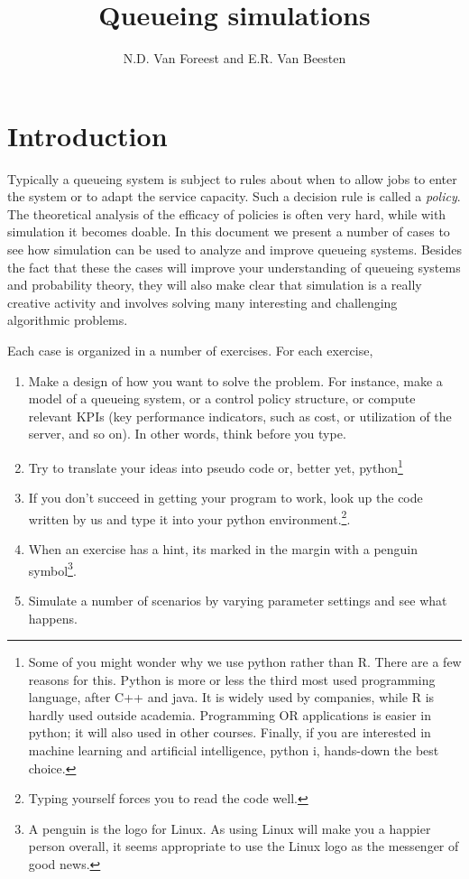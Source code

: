 \documentclass{scrartcl}
\title{Queueing simulations}
\author{N.D. Van Foreest and E.R. Van Beesten}
\begin{document}
\maketitle
\tableofcontents


\section{Introduction}

Typically a queueing system is subject to rules about when to allow jobs to enter the system or to adapt the service capacity.
Such a decision rule is called a \emph{policy}.
The theoretical analysis of the efficacy of policies is often very hard, while with simulation it becomes doable.
In this document we present a number of cases to see how simulation can be used to analyze and improve queueing systems.
Besides the fact that these the cases will improve your understanding of queueing systems and probability theory, they will also make clear that simulation is a really creative activity and involves solving many interesting and challenging algorithmic problems.


Each case is organized in a number of exercises.
For each exercise,
\begin{enumerate}
\item Make a design of how you want to solve the problem.
  For instance, make a model of a queueing system, or a control policy structure, or compute relevant KPIs (key performance indicators, such as cost, or utilization of the server, and so on).
  In other words, think before you type.
\item Try to translate your ideas into pseudo code or, better yet, python\footnote{Some of you might wonder why we use python rather than R.
    There are a few reasons for this.
    Python is more or less the third most used programming language, after C++ and java.
    It is widely used by companies, while R is hardly used outside academia.
    Programming OR applications is easier in python; it will also used in other courses.
    Finally, if you are interested in machine learning and artificial intelligence, python i, hands-down the best choice.}
  \item If you don't succeed in getting your program to work,  look up the code written by us and type it into your python environment.\footnote{Typing yourself forces you to read the code well.}.
  \item When an exercise has a hint, its marked in the margin with a penguin symbol\footnote{A penguin is the logo for Linux.
      As using Linux will make you a happier person overall, it seems appropriate to use the Linux logo as the messenger of good news.}.
    \hintsymbol
  \item Simulate a number of scenarios by varying parameter settings and see what happens.
\end{enumerate}
\end{document}
